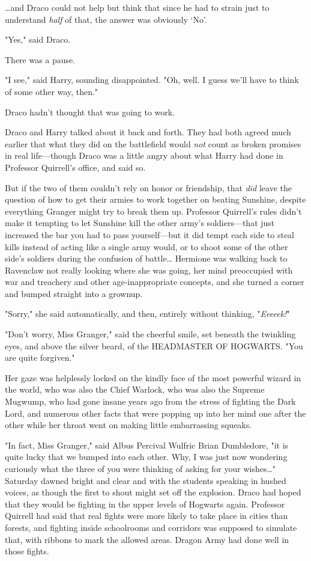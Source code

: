 {\ldots}and Draco could not help but think that since he had to strain just to 
understand \emph{half} of that, the answer was obviously `No'.

"Yes," said Draco.

There was a pause.

"I see," said Harry, sounding disappointed. "Oh, well. I guess we'll have to 
think of some other way, then."

Draco hadn't thought that was going to work.

Draco and Harry talked about it back and forth. They had both agreed much 
earlier that what they did on the battlefield would \emph{not} count as broken 
promises in real life---though Draco was a little angry about what Harry had 
done in Professor Quirrell's office, and said so.

But if the two of them couldn't rely on honor or friendship, that \emph{did} 
leave the question of how to get their armies to work together on beating 
Sunshine, despite everything Granger might try to break them up. Professor 
Quirrell's rules didn't make it tempting to let Sunshine kill the other army's 
soldiers---that just increased the bar you had to pass yourself---but it did 
tempt each side to steal kills instead of acting like a single army would, or 
to shoot some of the other side's soldiers during the confusion of 
battle{\ldots}
\sbreak
Hermione was walking back to Ravenclaw not really looking where she was going, 
her mind preoccupied with war and treachery and other age-inappropriate 
concepts, and she turned a corner and bumped straight into a grownup.

"Sorry," she said automatically, and then, entirely without thinking, 
"\emph{Eeeeek!}"

"Don't worry, Miss Granger," said the cheerful smile, set beneath the twinkling 
eyes, and above the silver beard, of the HEADMASTER OF HOGWARTS. "You are quite 
forgiven."

Her gaze was helplessly locked on the kindly face of the most powerful wizard 
in the world, who was also the Chief Warlock, who was also the Supreme Mugwump, 
who had gone insane years ago from the stress of fighting the Dark Lord, and 
numerous other facts that were popping up into her mind one after the other 
while her throat went on making little embarrassing squeaks.

"In fact, Miss Granger," said Albus Percival Wulfric Brian Dumbledore, "it is 
quite lucky that we bumped into each other. Why, I was just now wondering 
curiously what the three of you were thinking of asking for your wishes{\ldots}"
\sbreak
Saturday dawned bright and clear and with the students speaking in hushed 
voices, as though the first to shout might set off the explosion.
\sbreak
Draco had hoped that they would be fighting in the upper levels of Hogwarts 
again. Professor Quirrell had said that real fights were more likely to take 
place in cities than forests, and fighting inside schoolrooms and corridors was 
supposed to simulate that, with ribbons to mark the allowed areas. Dragon Army 
had done well in those fights.

